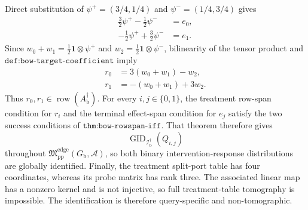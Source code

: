 Direct substitution of \(\psi^+=(3/4,1/4)\) and
\(\psi^-=(1/4,3/4)\) gives
\[
 \begin{aligned}
 \frac32\psi^+-\frac12\psi^-&=e_0,\\
 -\frac12\psi^++\frac32\psi^-&=e_1.
 \end{aligned}
\]
Since \(w_0+w_1=\tfrac12\mathbf 1\otimes\psi^+\) and
\(w_2=\tfrac12\mathbf 1\otimes\psi^-\), bilinearity of the tensor product
and \(\texttt{def:bow-target-coefficient}\) imply
\[
 \begin{aligned}
 r_0&=3(w_0+w_1)-w_2,\\
 r_1&=-(w_0+w_1)+3w_2.
 \end{aligned}
\]
Thus \(r_0,r_1\in\operatorname{row}(A_{\mathrm b}^{\dagger})\).
For every \(i,j\in\{0,1\}\), the treatment row-span condition for \(r_i\)
and the terminal effect-span condition for \(e_j\) satisfy the two success
conditions of \(\texttt{thm:bow-rowspan-iff}\).  That theorem therefore
gives
\[
 \operatorname{GID}_{\mathcal I_{\mathrm b}^{\dagger}}(Q_{i,j})
\]
throughout \(\mathfrak M_{\mathrm{pp}}^{\mathrm{edge}}(G_{\mathrm b},\mathcal A)\),
so both binary intervention-response distributions are globally identified.
Finally, the treatment split-port table has four coordinates, whereas its
probe matrix has rank three.  The associated linear map has a nonzero kernel
and is not injective, so full treatment-table tomography is impossible.  The
identification is therefore query-specific and non-tomographic.